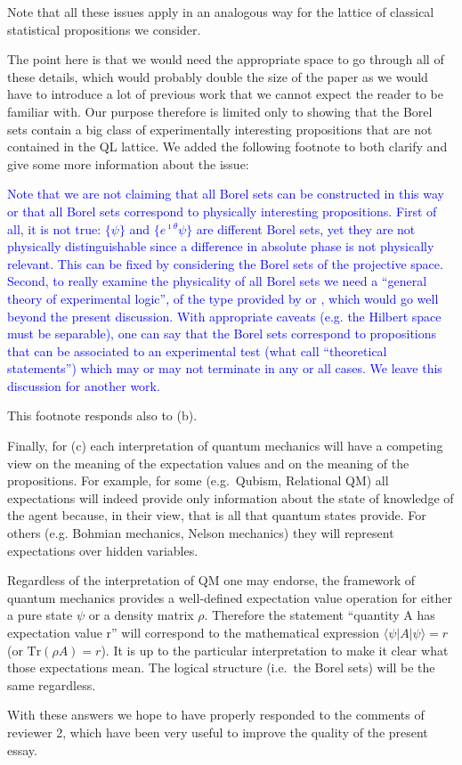\documentclass[11pt, executivepaper]{article}
\begin{document}
\begin{enumerate}
Note that all these issues apply in an analogous way for the lattice of classical statistical propositions we consider.

The point here is that we would need the appropriate space to go through all of these details, which would probably double the size of the paper as we would have to introduce a lot of previous work that we cannot expect the reader to be familiar with. Our purpose therefore is limited only to showing that the Borel sets contain a big class of experimentally interesting propositions that are not contained in the QL lattice. We added the following footnote to both clarify and give some more information about the issue:

\textcolor{blue}{Note that we are not claiming that all Borel sets can be constructed in this way or that all Borel sets correspond to physically interesting propositions. First of all, it is not true: $\{ \psi \}$ and $\{ e^{\imath \theta} \psi\}$ are different Borel sets, yet they are not physically distinguishable since a difference in absolute phase is not physically relevant. This can be fixed by considering the Borel sets of the projective space. Second, to really examine the physicality of all Borel sets we need a ``general theory of experimental logic'', of the type provided by \cite{Kelly:1996} or \cite{Carcassi:2021}, which would go well beyond the present discussion. With appropriate caveats (e.g. the Hilbert space must be separable), one can say that the Borel sets correspond to propositions that can be associated to an experimental test (what \cite{Carcassi:2021} call ``theoretical statements'') which may or may not terminate in any or all cases. We leave this discussion for another work.}

This footnote responds also to (b).

Finally, for (c) each interpretation of quantum mechanics will have a competing view on the meaning of the expectation values and on the meaning of the propositions. For example, for some (e.g.\ Qubism, Relational QM) all expectations will indeed provide only information about the state of knowledge of the agent because, in their view, that is all that quantum states provide. For others (e.g. Bohmian mechanics, Nelson mechanics) they will represent expectations over hidden variables.

Regardless of the interpretation of QM one may endorse, the framework of quantum mechanics provides a well-defined expectation value operation for either a pure state $\psi$ or a density matrix $\rho$. Therefore the statement ``quantity A has expectation value r'' will correspond to the mathematical expression $\langle \psi | A | \psi \rangle = r$ (or $\text{Tr}(\rho A) = r$). It is up to the particular interpretation to make it clear what those expectations mean. The logical structure (i.e.\ the Borel sets) will be the same regardless.
\end{enumerate}

\noindent With these answers we hope to have properly responded to the comments of reviewer 2, which have been very useful to improve the quality of the present essay.

\clearpage


\end{document}
